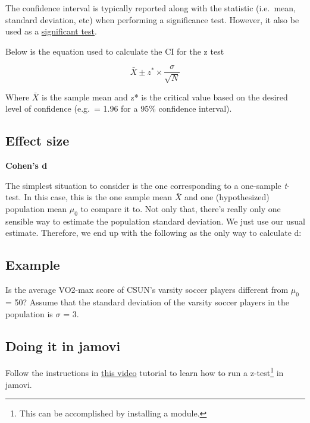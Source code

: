 \documentclass[
]{article}
\begin{document}
The confidence interval is typically reported along with the statistic (i.e.~mean, standard deviation, etc) when performing a significance test. However, it also be used as a \href{https://statkat.com/confidence-interval-as-test/one-sample-z-test.php}{significant test}.

Below is the equation used to calculate the CI for the z test

\begin{equation} 
\bar{X} \pm z^* \times \dfrac{\sigma}{\sqrt{N}}
\label{eq:confidence-interval}
\end{equation}

Where \(\bar{X}\) is the sample mean and z* is the critical value based on the desired level of confidence (e.g.~= 1.96 for a 95\% confidence interval).

\hypertarget{effect-size-1}{%
\subsection{Effect size}\label{effect-size-1}}

\textbf{Cohen's d}

The simplest situation to consider is the one corresponding to a one-sample \emph{t}-test. In this case, this is the one sample mean \(\bar{X}\) and one (hypothesized) population mean \(\mu_0\) to compare it to. Not only that, there's really only one sensible way to estimate the population standard deviation. We just use our usual estimate. Therefore, we end up with the following as the only way to calculate d:

\hypertarget{example-1}{%
\subsection{Example}\label{example-1}}

Is the average VO2-max score of CSUN's varsity soccer players different from \(\mu_0\) = 50? Assume that the standard deviation of the varsity soccer players in the population is \(\sigma\) = 3.

\hypertarget{doing-it-in-jamovi-1}{%
\subsection{Doing it in jamovi}\label{doing-it-in-jamovi-1}}

Follow the instructions in \href{https://youtu.be/dE-fQzM86Ew}{this video} tutorial to learn how to run a z-test\footnote{This can be accomplished by installing a module.} in jamovi.
\end{document}
